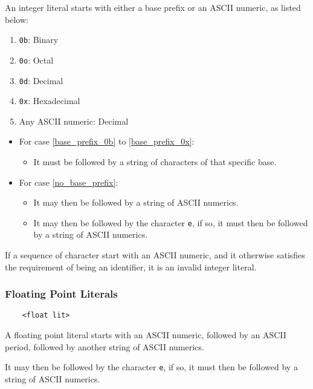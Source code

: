 \documentclass[a4paper]{article}
\begin{document}
An integer literal starts with either a base prefix or an ASCII numeric, as listed below:

\begin{enumerate}
    \item \verb|0b|: Binary
        \label{base_prefix_0b}
    \item \verb|0o|: Octal
    \item \verb|0d|: Decimal
    \item \verb|0x|: Hexadecimal
        \label{base_prefix_0x}
    \item Any ASCII numeric: Decimal
        \label{no_base_prefix}
\end{enumerate}

\begin{itemize}
    \item For case \ref{base_prefix_0b} to \ref{base_prefix_0x}:
    \begin{itemize}
        \item It must be followed by a string of characters of that specific base.
    \end{itemize}
    \item For case \ref{no_base_prefix}:
    \begin{itemize}
        \item It may then be followed by a string of ASCII numerics.
        \item It may then be followed by the character \verb|e|, if so, it must then be followed by a string of ASCII numerics.
    \end{itemize}
\end{itemize}

If a sequence of character start with an ASCII numeric, and it otherwise satisfies the requirement of being an identifier, it is an invalid integer literal.

\subsubsection{Floating Point Literals}

\begin{verbatim}
    <float lit>
\end{verbatim}

A floating point literal starts with an ASCII numeric, followed by an ASCII period, followed by another string of ASCII numerics.

It may then be followed by the character \verb|e|, if so, it must then be followed by a string of ASCII numerics.
\end{document}
